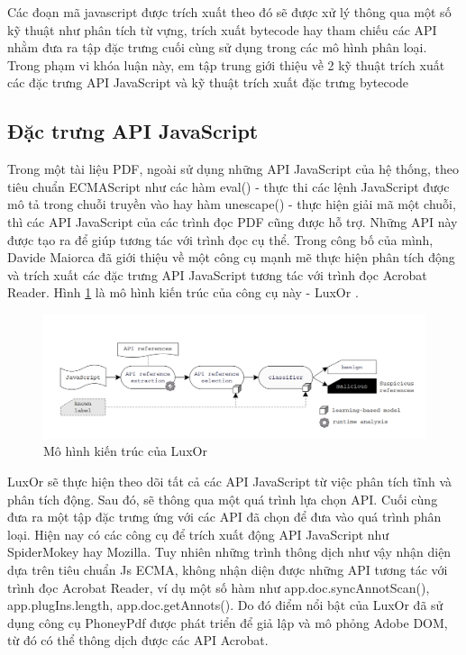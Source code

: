 \documentclass[./../main.tex]{subfiles}
\begin{document}
Các đoạn mã javascript được trích xuất theo đó sẽ được xử lý thông qua một số kỹ thuật như phân tích từ vựng, trích xuất bytecode hay tham chiếu các API nhằm đưa ra tập đặc trưng cuối cùng sử dụng trong các mô hình phân loại. Trong phạm vi khóa luận này, em tập trung giới thiệu về 2 kỹ thuật trích xuất các đặc trưng API JavaScript và kỹ thuật trích xuất đặc trưng bytecode

\subsection*{Đặc trưng API JavaScript}

Trong một tài liệu PDF, ngoài sử dụng những API JavaScript của hệ thống, theo tiêu chuẩn ECMAScript như các hàm eval() - thực thi các lệnh JavaScript được mô tả trong chuỗi truyền vào hay hàm unescape() - thực hiện giải mã một chuỗi, thì các API JavaScript của các trình đọc PDF cũng được hỗ trợ. Những API này được tạo ra để giúp tương tác với trình đọc cụ thể. Trong công bố của mình, Davide Maiorca đã giới thiệu về một công cụ mạnh mẽ thực hiện phân tích động và trích xuất các đặc trưng API JavaScript tương tác với trình đọc Acrobat Reader. Hình \ref{fig:luxor} là mô hình kiến trúc của công cụ này - LuxOr \cite{luxor}.

\begin{figure}[H]
	\centering
	\includegraphics[width=\linewidth]{./images/luxOr.png}
	\caption{Mô hình kiến trúc của LuxOr \cite{luxor}}
	\label{fig:luxor}
\end{figure}

LuxOr sẽ thực hiện theo dõi tất cả các API JavaScript từ việc phân tích tĩnh và phân tích động. Sau đó, sẽ thông qua một quá trình lựa chọn API. Cuối cùng đưa ra một tập đặc trưng ứng với các API đã chọn để đưa vào quá trình phân loại. Hiện nay có các công cụ để trích xuất động API JavaScript như SpiderMokey hay Mozilla. Tuy nhiên những trình thông dịch như vậy nhận diện dựa trên tiêu chuẩn Js ECMA, không nhận diện được những API tương tác với trình đọc Acrobat Reader, ví dụ một số hàm như app.doc.syncAnnotScan(), app.plugIns.length, app.doc.getAnnots(). Do đó điểm nổi bật của LuxOr đã sử dụng công cụ PhoneyPdf được phát triển để giả lập và mô phỏng Adobe DOM, từ đó có thể thông dịch được các API Acrobat.
\end{document}
